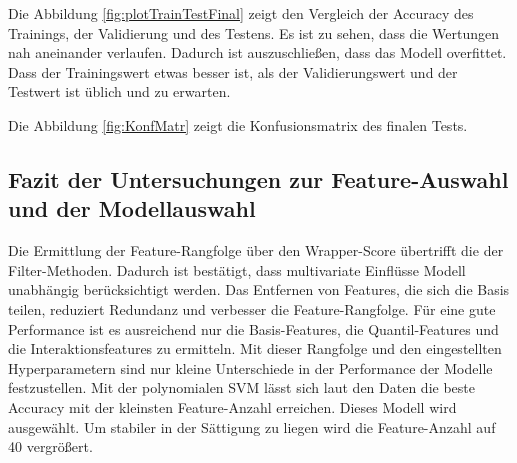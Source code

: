 Die Abbildung \ref{fig:plotTrainTestFinal} zeigt den Vergleich der Accuracy des Trainings, der Validierung und des Testens. Es ist zu sehen, dass die Wertungen nah aneinander verlaufen. Dadurch ist auszuschließen, dass das Modell overfittet. Dass der Trainingswert etwas besser ist, als der Validierungswert und der Testwert ist üblich und zu erwarten. 


Die Abbildung \ref{fig:KonfMatr} zeigt die Konfusionsmatrix des finalen Tests.


\subsection{Fazit der Untersuchungen zur Feature-Auswahl und der Modellauswahl}
Die Ermittlung der Feature-Rangfolge über den Wrapper-Score übertrifft die der Filter-Methoden. Dadurch ist bestätigt, dass multivariate Einflüsse Modell unabhängig berücksichtigt werden. Das Entfernen von Features, die sich die Basis teilen, reduziert Redundanz und verbesser die Feature-Rangfolge. Für eine gute Performance ist es ausreichend nur die Basis-Features, die Quantil-Features und die Interaktionsfeatures zu ermitteln. Mit dieser Rangfolge und den eingestellten Hyperparametern sind nur kleine Unterschiede in der Performance der Modelle festzustellen. Mit der polynomialen SVM lässt sich laut den Daten die beste Accuracy mit der kleinsten Feature-Anzahl erreichen. Dieses Modell wird ausgewählt. Um stabiler in der Sättigung zu liegen wird die Feature-Anzahl auf 40 vergrößert.